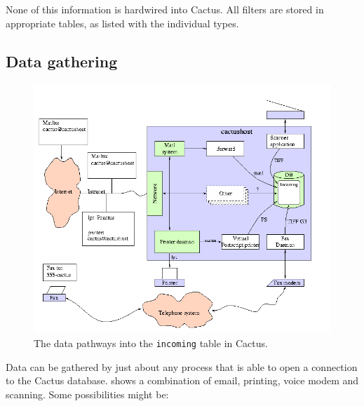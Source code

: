 None of this information is hardwired into Cactus.  All
filters are stored in appropriate tables, as listed with the
individual types.

\subsection{Data gathering}



\begin{figure}[tbhp]
    \begin{center}
      
      \includegraphics[scale=0.7]{gr/gather} 
      \caption{The data pathways into the \texttt{incoming} table in Cactus.}
      \label{fig:gather}
    \end{center}
  \end{figure}

Data can be gathered by just about any process that is able
to open a connection to the Cactus database.
 shows a combination of email, printing,
voice modem and scanning.  Some possibilities might be:


